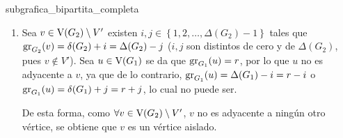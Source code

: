 \documentclass[fleqn, 11pt]{beamer}
\begin{document}
\begin{teorema}[breakable, pad at break = 4mm, beforeafter skip = 4mm]{}{subgrafica_bipartita_completa}
\begin{enumerate}
            (no hay más posibilidades, pues $ G_1 $ es $ r $-regular y los vértices de \textnormal{V}' son aquellos cuyo grado es máximo o mínimo). \vspace{2mm}
    
            Por lo tanto, $ H $ es una gráfica bipartita completa. \vspace{2mm}

            \item Sea $ v \in \textnormal{V}(G_2) \setminus V' $ existen $ i, j \in \left\lbrace 1, 2, \ldots, \Delta(G_2) - 1 \right\rbrace $ tales que $ \textnormal{gr}_{G_2}(v) = \delta(G_2) + i = \Delta(G_2) - j $ ($ i, j $ son distintos de cero y de $ \Delta(G_2) $, pues $ v \notin V' $). Sea $ u \in \textnormal{V}(G_1) $ se da que $ \textnormal{gr}_{G_1}(u) = r $, por lo que $ u $ no es adyacente a $ v $, ya que de lo contrario, $ \textnormal{gr}_{G_1}(u) = \Delta(G_1) - i = r - i $ o $ \textnormal{gr}_{G_1}(u) = \delta(G_1) + j = r + j $, lo cual no puede ser.
            
            De esta forma, como $ \forall v \in \textnormal{V}(G_2) \setminus V' $, $ v $ no es adyacente a ningún otro vértice, se obtiene que $ v $ es un vértice aislado.
        \end{enumerate} 
    \end{teorema}
\end{document}
